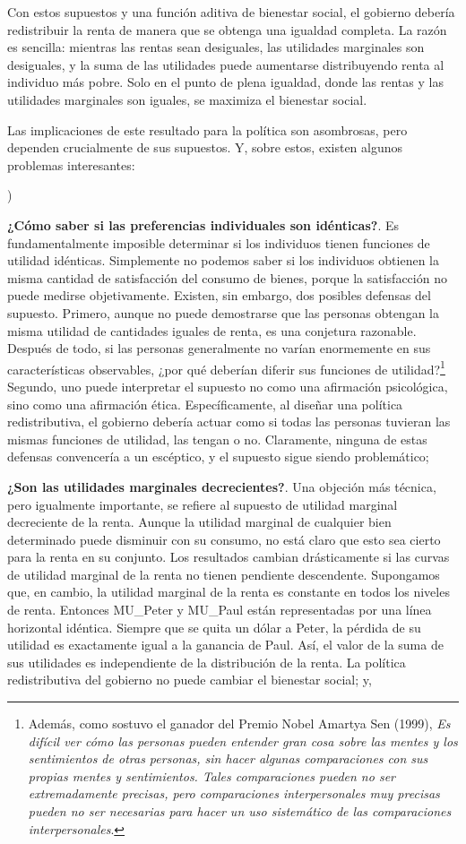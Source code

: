 \documentclass[10pt,a4paper]{article}
\newcounter{alphaitem}
\newenvironment{la}
      {\begin{list}{\alph{alphaitem})}{%
          \usecounter{alphaitem}%
          \setlength{\leftmargin}{1cm}%
          \setlength{\parskip}{3pt}%
          \setlength{\itemsep}{0pt}%
          \setlength{\parsep}{0pt}%
      }}
      {\end{list}}
\begin{document}
Con estos supuestos y una función aditiva de bienestar social, el gobierno debería redistribuir la renta de manera que se obtenga una igualdad completa. La razón es sencilla: mientras las rentas sean desiguales, las utilidades marginales son desiguales, y la suma de las utilidades puede aumentarse distribuyendo renta al individuo más pobre. Solo en el punto de plena igualdad, donde las rentas y las utilidades marginales son iguales, se maximiza el bienestar social. 

Las implicaciones de este resultado para la política son asombrosas, pero dependen crucialmente de sus supuestos. Y, sobre estos, existen algunos problemas interesantes:
\begin{la}
    \item \textbf{¿Cómo saber si las preferencias individuales son idénticas?}. Es fundamentalmente imposible determinar si los individuos tienen funciones de utilidad idénticas. Simplemente no podemos saber si los individuos obtienen la misma cantidad de satisfacción del consumo de bienes, porque la satisfacción no puede medirse objetivamente. Existen, sin embargo, dos posibles defensas del supuesto. Primero, aunque no puede demostrarse que las personas obtengan la misma utilidad de cantidades iguales de renta, es una conjetura razonable. Después de todo, si las personas generalmente no varían enormemente en sus características observables, ¿por qué deberían diferir sus funciones de utilidad?\footnote{%
        Además, como sostuvo el ganador del Premio Nobel Amartya Sen (1999), \textit{Es difícil ver cómo las personas pueden entender gran cosa sobre las mentes y los sentimientos de otras personas, sin hacer algunas comparaciones con sus propias mentes y sentimientos. Tales comparaciones pueden no ser extremadamente precisas, pero comparaciones interpersonales muy precisas pueden no ser necesarias para hacer un uso sistemático de las comparaciones interpersonales}.
    } Segundo, uno puede interpretar el supuesto no como una afirmación psicológica, sino como una afirmación ética. Específicamente, al diseñar una política redistributiva, el gobierno debería actuar como si todas las personas tuvieran las mismas funciones de utilidad, las tengan o no. Claramente, ninguna de estas defensas convencería a un escéptico, y el supuesto sigue siendo problemático;
    \item \textbf{¿Son las utilidades marginales decrecientes?}. Una objeción más técnica, pero igualmente importante, se refiere al supuesto de utilidad marginal decreciente de la renta. Aunque la utilidad marginal de cualquier bien determinado puede disminuir con su consumo, no está claro que esto sea cierto para la renta en su conjunto. Los resultados cambian drásticamente si las curvas de utilidad marginal de la renta no tienen pendiente descendente. Supongamos que, en cambio, la utilidad marginal de la renta es constante en todos los niveles de renta. Entonces MU_Peter y MU_Paul están representadas por una línea horizontal idéntica. Siempre que se quita un dólar a Peter, la pérdida de su utilidad es exactamente igual a la ganancia de Paul. Así, el valor de la suma de sus utilidades es independiente de la distribución de la renta. La política redistributiva del gobierno no puede cambiar el bienestar social; y,

\end{la}
\end{document}
